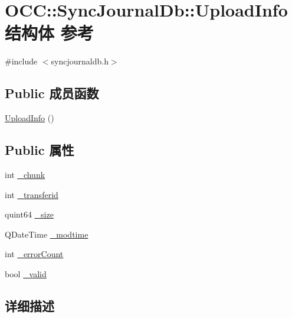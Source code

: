 \hypertarget{struct_o_c_c_1_1_sync_journal_db_1_1_upload_info}{}\section{O\+CC\+:\+:Sync\+Journal\+Db\+:\+:Upload\+Info结构体 参考}
\label{struct_o_c_c_1_1_sync_journal_db_1_1_upload_info}


{\ttfamily \#include $<$syncjournaldb.\+h$>$}

\subsection*{Public 成员函数}
\begin{DoxyCompactItemize}
\item 
\hyperlink{struct_o_c_c_1_1_sync_journal_db_1_1_upload_info_a0e9df02066dfd913ed3fa205a47e3f16}{Upload\+Info} ()
\end{DoxyCompactItemize}
\subsection*{Public 属性}
\begin{DoxyCompactItemize}
\item 
int \hyperlink{struct_o_c_c_1_1_sync_journal_db_1_1_upload_info_a433d16a8403cdde80ef70f0aceb32818}{\+\_\+chunk}
\item 
int \hyperlink{struct_o_c_c_1_1_sync_journal_db_1_1_upload_info_adc4667994b78b7665bf62a345311ae48}{\+\_\+transferid}
\item 
quint64 \hyperlink{struct_o_c_c_1_1_sync_journal_db_1_1_upload_info_a1ade7b6c15b859a8a021f1bb132d3220}{\+\_\+size}
\item 
Q\+Date\+Time \hyperlink{struct_o_c_c_1_1_sync_journal_db_1_1_upload_info_aa86afa284606d3526c615c9a2575922e}{\+\_\+modtime}
\item 
int \hyperlink{struct_o_c_c_1_1_sync_journal_db_1_1_upload_info_adfd03177bb71e8192e6786ec0d200643}{\+\_\+error\+Count}
\item 
bool \hyperlink{struct_o_c_c_1_1_sync_journal_db_1_1_upload_info_a4742d1331bae058daccd0f4ec11c498a}{\+\_\+valid}
\end{DoxyCompactItemize}


\subsection{详细描述}


